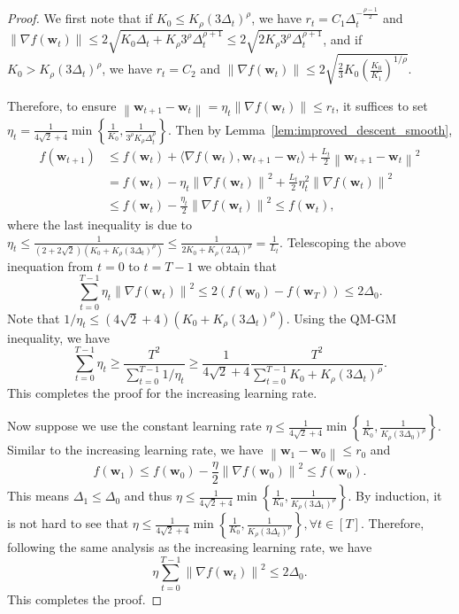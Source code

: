 \documentclass{article}
\newcommand{\Norm}[1]{\left\|#1\right\|}
\newcommand{\Kr}{K_{\rho}}
\newcommand{\paren}[1]{\left( #1 \right)}
\newcommand{\bw}{\mathbf{w}}
\begin{document}
\begin{proof}
    We first note that if $K_0\leq \Kr\paren{3\Delta_t}^\rho$, we have 
    $r_t=C_1\Delta_t^{-\frac{\rho-1}{2}}$ and $\Norm{\nabla f(\bw_t)}\leq 2\sqrt{K_0\Delta_t+\Kr 3^\rho\Delta_t^{\rho+1}}\leq 2\sqrt{2\Kr3^\rho\Delta_t^{\rho+1}}$, and if $K_0>\Kr\paren{3\Delta_t}^{\rho}$, we have $r_t=C_2$ and $\Norm{\nabla f(\bw_t)}\leq 2\sqrt{\frac{2}{3} K_0\paren{\frac{K_0}{K_1}}^{1/\rho}}$.

    Therefore, to ensure $\Norm{\bw_{t+1}-\bw_t}=\eta_t\Norm{\nabla f(\bw_t)}\leq r_t$, it suffices to set $\eta_t=\frac{1}{4\sqrt{2}+4}\min\left\{\frac{1}{K_0},\frac{1}{3^\rho\Kr\Delta_t^{\rho}}\right\}$. Then by Lemma~\ref{lem:improved_descent_smooth}, 
    \begin{equation}\nonumber
        \begin{aligned}
            f(\bw_{t+1})&\leq f(\bw_t)+\langle\nabla f(\bw_t),\bw_{t+1}-\bw_t\rangle+\frac{L_t}{2}\Norm{\bw_{t+1}-\bw_t}^2\\
            &=f(\bw_t)-\eta_t\Norm{\nabla f(\bw_t)}^2+\frac{L_t}{2}\eta_t^2\Norm{\nabla f(\bw_t)}^2\\
            &\leq f(\bw_t)-\frac{\eta_t}{2}\Norm{\nabla f(\bw_t)}^2\leq f(\bw_t),
        \end{aligned}
    \end{equation}
    where the last inequality is due to $\eta_t\leq \frac{1}{\paren{2+2\sqrt{2}}\paren{K_0+\Kr\paren{3\Delta_t}^\rho}}\leq \frac{1}{2K_0+\Kr\paren{2\Delta_t}^\rho}=\frac{1}{L_t}.$
    Telescoping the above inequation from $t=0$ to $t=T-1$ we obtain that
    $$\sum_{t=0}^{T-1}\eta_t\Norm{\nabla f(\bw_t)}^2\leq 2\left(f(\bw_0)-f(\bw_T)\right)\leq 2\Delta_0. $$
    Note that $1/\eta_t\leq (4\sqrt{2}+4)\paren{K_0+\Kr\paren{3\Delta_t}^\rho}$. 
    Using the QM-GM inequality, we have 
    $$\sum_{t=0}^{T-1} \eta_t\geq \frac{T^2}{\sum_{t=0}^{T-1}1/\eta_t}\geq \frac{1}{4\sqrt{2}+4}\frac{T^2}{\sum_{t=0}^{T-1}K_0+\Kr\paren{3\Delta_t}^\rho}.$$
    This completes the proof for the increasing learning rate.

    Now suppose we use the constant learning rate $\eta\leq \frac{1}{4\sqrt{2}+4}\min\left\{\frac{1}{K_0},\frac{1}{\Kr\paren{3\Delta_0}^\rho}\right\}$. Similar to the increasing learning rate, we have 
    $\Norm{\bw_1-\bw_0}\leq r_0$ and 
    $$f(\bw_1)\leq f(\bw_0)-\frac{\eta}{2}\Norm{\nabla f(\bw_0)}^2\leq f(\bw_0).$$
    This means $\Delta_1\leq\Delta_0$ and thus $\eta\leq \frac{1}{4\sqrt{2}+4}\min\left\{\frac{1}{K_0},\frac{1}{\Kr\paren{3\Delta_1}^\rho}\right\}$. 
    By induction, it is not hard to see that $\eta\leq \frac{1}{4\sqrt{2}+4}\min\left\{\frac{1}{K_0},\frac{1}{\Kr\paren{3\Delta_t}^\rho}\right\},\forall t\in[T]$. Therefore, following the same analysis as the increasing learning rate, we have
    $$\eta\sum_{t=0}^{T-1}\Norm{\nabla f(\bw_t)}^2\leq 2\Delta_0.$$
    This completes the proof.
\end{proof}
\end{document}
